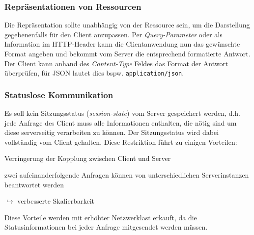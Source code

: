 \subsubsection{Repräsentationen von Ressourcen}
\label{sec:representationofresources}

Die Repräsentation sollte unabhängig von der Ressource sein, um die Darstellung gegebenenfalls für den Client anzupassen. Per \emph{Query-Parameter} oder als Information im HTTP-Header kann die Clientanwendung nun das gewünschte Format angeben und bekommt vom Server die entsprechend formatierte Antwort. Der Client kann anhand des \emph{Content-Type} Feldes das Format der Antwort überprüfen, für \gls{JSON} lautet dies bspw. \texttt{application/json}.

\subsubsection{Statuslose Kommunikation}

Es soll kein Sitzungsstatus (\emph{session-state}) vom Server gespeichert werden, d.h. jede Anfrage des Client muss alle Informationen enthalten, die nötig sind um diese serverseitig verarbeiten zu können. Der Sitzungsstatus wird dabei vollständig vom Client gehalten. Diese Restriktion führt zu einigen Vorteilen:
\begin{compactitem}
    \item Verringerung der Kopplung zwischen Client und Server
    \item zwei aufeinanderfolgende Anfragen können von unterschiedlichen Serverinstanzen beantwortet werden
    \item[$\hookrightarrow$] verbesserte Skalierbarkeit
\end{compactitem}
Diese Vorteile werden mit erhöhter Netzwerklast erkauft, da die Statusinformationen bei jeder Anfrage mitgesendet werden müssen.